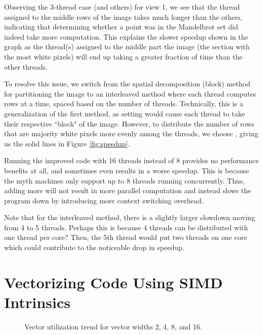 \documentclass[11pt]{article}
\begin{document}
\smallskip
Observing the 3-thread case (and others) for view 1, we see that the thread
assigned to the middle rows of the image takes much longer than the others,
indicating that determining whether a point was in the Mandelbrot set did indeed
take more computation. This explains the slower speedup shown in the graph as
the thread(s) assigned to the middle part the image (the section with the most
white pixels) will end up taking a greater fraction of time than the other
threads.

\smallskip
To resolve this issue, we switch from the spatial decomposition (block) method
for partitioning the image to an interleaved method where each thread computes
 rows at a time, spaced based on the number of threads.
Technically, this is a generalization of the first method, as setting
 would cause each thread to take their respective
``block" of the image. However, to distribute the number of rows that are
majority white pixels more evenly among the threads, we choose ,
giving us the solid lines in Figure \ref{fig:speedup}.

\smallskip
Running the improved code with 16 threads instead of 8 provides no performance
benefits at all, and sometimes even results in a worse speedup. This is because
the myth machines only support up to 8 threads running concurrently. Thus,
adding more will not result in more parallel computation and instead slows the
program down by introducing more context switching overhead.

\medskip
Note that for the interleaved method, there is a slightly larger slowdown
moving from 4 to 5 threads. Perhaps this is because 4 threads can be distributed
with one thread per core? Then, the 5th thread would put two threads on one core
which could contribute to the noticeable drop in speedup.

\section{Vectorizing Code Using SIMD Intrinsics}

\begin{figure}[hpt]
  \centering
  \caption{Vector utilization trend for vector widths 2, 4, 8, and 16.}
  \label{fig:vecutil}
\end{figure}
\end{document}
